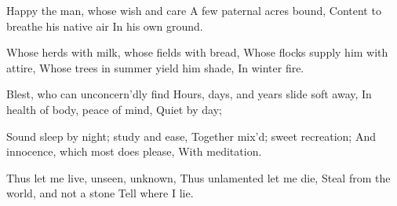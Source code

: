 \startlanguage[en]
\startlines
Happy the man, whose wish and care
A few paternal acres bound,
Content to breathe his native air
In his own ground.

Whose herds with milk, whose fields with bread,
Whose flocks supply him with attire,
Whose trees in summer yield him shade,
In winter fire.

Blest, who can unconcern'dly find
Hours, days, and years slide soft away,
In health of body, peace of mind,
Quiet by day;

Sound sleep by night; study and ease,
Together mix'd; sweet recreation;
And innocence, which most does please,
With meditation.

Thus let me live, unseen, unknown,
Thus unlamented let me die,
Steal from the world, and not a stone
Tell where I lie.
\stoplines
\stoplanguage
